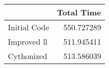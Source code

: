\begin{tabular}{lr}
\toprule
{} &  Total Time \\
\midrule
Initial Code &  550.727289 \\
Improved ll  &  511.945411 \\
Cythonized   &  513.586039 \\
\bottomrule
\end{tabular}
